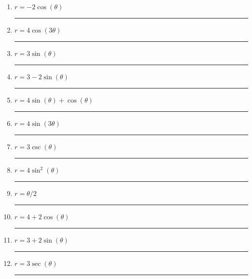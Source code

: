 \documentclass[11pt]{exam}
\begin{document}
\newcommand\aline[1]{\rule{0.5in}{0.2pt} }

\vspace{2ex}
\begin{multicols}{3}
	\begin{enumerate}
		\item $r = -2 \cos(\theta)$ \aline{B}
		\item $r=4\cos(3\theta)$ \aline{G}
		\item $r = 3\sin(\theta)$ \aline{A}
		\item $r = 3-2\sin(\theta)$ \aline{D}
		\item $r=4\sin(\theta)+\cos(\theta)$ \aline{H}
		\item $r=4\sin(3\theta)$ \aline{F}
		\item $r = 3\csc(\theta)$ \aline{L}
		\item $r=4\sin^2(\theta)$ \aline{I}
		\item $r = \theta/2$ \aline{K}
		\item $r=4+2\cos(\theta)$ \aline{E}
		\item $r = 3+2\sin(\theta)$ \aline{C}
		\item $r = 3\sec(\theta)$ \aline{J}
	\end{enumerate}
	\end{multicols}
\clearpage
\end{document}
